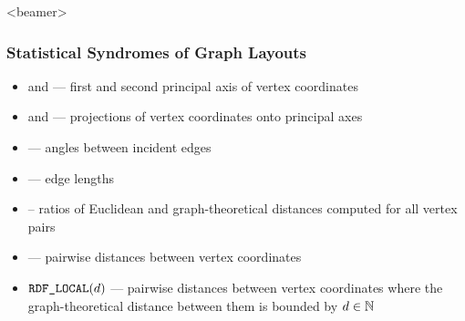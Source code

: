 \documentclass{beamer}
\providecommand*{\BonusSlide}{beamer}
\begin{document}
\begin{frame}<\BonusSlide>
  \frametitle{Statistical Syndromes of Graph Layouts}
  \begin{itemize}
    \item{} and  --- first and second principal axis of vertex coordinates
    \item{} and  --- projections of vertex coordinates onto principal axes
    \item{} --- angles between incident edges
    \item{} --- edge lengths
    \item{} -- ratios of Euclidean and graph-theoretical distances computed for all vertex pairs
    \item{} --- pairwise distances between vertex coordinates
    \item\(\mbox{\text{\upshape\ttfamily RDF\_LOCAL}}(d)\) --- pairwise distances between vertex coordinates where the graph-theoretical
      distance between them is bounded by $d\in\mathbb{N}$
  \end{itemize}
  \par\vfill
\end{frame}


\end{document}
